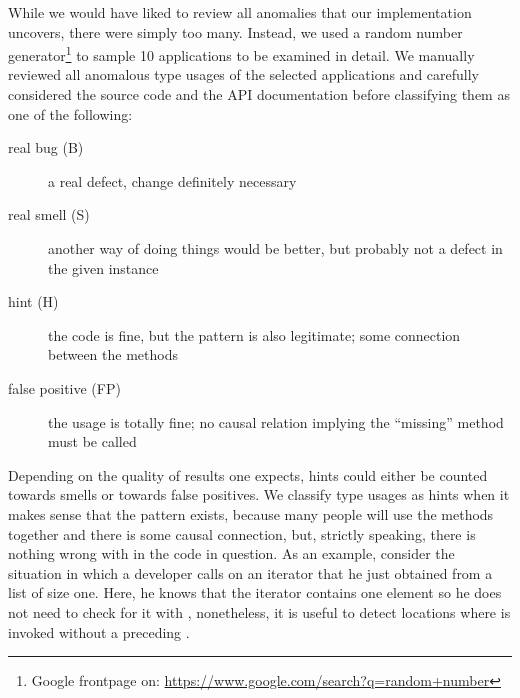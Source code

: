 While we would have liked to review all anomalies that our implementation uncovers, there were simply too many.
Instead, we used a random number generator\footnote{Google frontpage on: \url{https://www.google.com/search?q=random+number}} to sample 10 applications to be examined in detail.
We manually reviewed all anomalous type usages of the selected applications and carefully considered the source code and the API documentation before classifying them as one of the following:
\begin{description}
    \item [real bug (B)] a real defect, change definitely necessary
    \item [real smell (S)] another way of doing things would be better, but probably not a defect in the given instance
    \item [hint (H)] the code is fine, but the pattern is also legitimate; some connection between the methods
    \item [false positive (FP)] the usage is totally fine; no causal relation implying the ``missing'' method must be called
\end{description}


Depending on the quality of results one expects, hints could either be counted towards smells or towards false positives.
We classify type usages as hints when it makes sense that the pattern exists, because many people will use the methods together and there is some causal connection, but, strictly speaking, there is nothing wrong with in the code in question.
As an example, consider the situation in which a developer calls  on an iterator that he just obtained from a list of size one.
Here, he knows that the iterator contains one element so he does not need to check for it with , nonetheless, it is useful to detect locations where  is invoked without a preceding .


